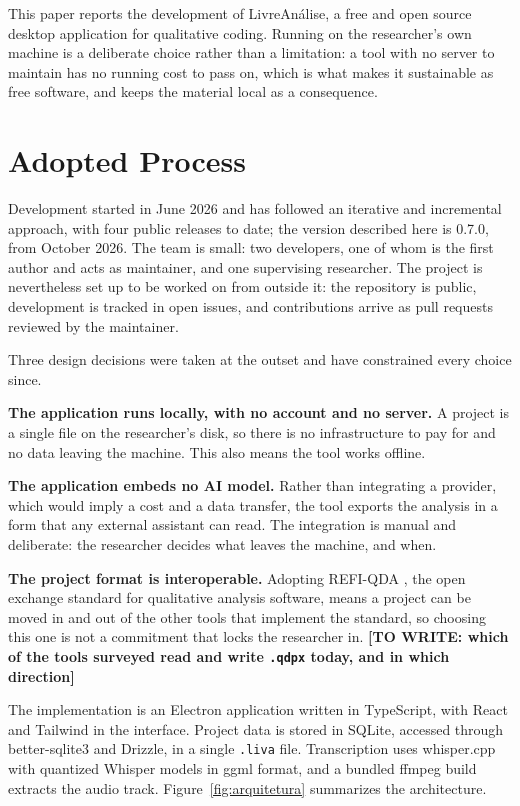 \documentclass[12pt]{article}
\newcommand{\todo}[1]{\textbf{[TO WRITE: #1]}}
\begin{document}
This paper reports the development of LivreAn\'alise, a free and open source
desktop application for qualitative coding. Running on the researcher's own
machine is a deliberate choice rather than a limitation: a tool with no server
to maintain has no running cost to pass on, which is what makes it sustainable
as free software, and keeps the material local as a consequence.

\section{Adopted Process}

Development started in June 2026 and has followed an iterative and incremental
approach, with four public releases to date; the version described here is
0.7.0, from October 2026. The team is small: two developers, one of whom is the
first author and acts as maintainer, and one supervising researcher. The
project is nevertheless set up to be worked on from outside it: the repository
is public, development is tracked in open issues, and contributions arrive as
pull requests reviewed by the maintainer.

Three design decisions were taken at the outset and have constrained every
choice since.

\textbf{The application runs locally, with no account and no server.} A project
is a single file on the researcher's disk, so there is no infrastructure to pay
for and no data leaving the machine. This also means the tool works offline.

\textbf{The application embeds no AI model.} Rather than integrating a
provider, which would imply a cost and a data transfer, the tool exports the analysis in a form that any external assistant can
read. The integration is manual and deliberate: the researcher decides what
leaves the machine, and when.

\textbf{The project format is interoperable.} Adopting REFI-QDA
\cite{refiqda}, the open exchange standard for qualitative analysis software,
means a project can be moved in and out of the other tools that implement the
standard, so choosing this one is not a commitment that locks the researcher
in.
\todo{which of the tools surveyed read and write \texttt{.qdpx} today, and in
which direction}

The implementation is an Electron application written in TypeScript, with React
and Tailwind in the interface. Project data is stored in SQLite, accessed
through better-sqlite3 and Drizzle, in a single \texttt{.liva} file.
Transcription uses whisper.cpp with quantized Whisper models
\cite{radford:23} in ggml format, and a bundled ffmpeg build extracts the audio
track. Figure~\ref{fig:arquitetura} summarizes the architecture.
\end{document}
